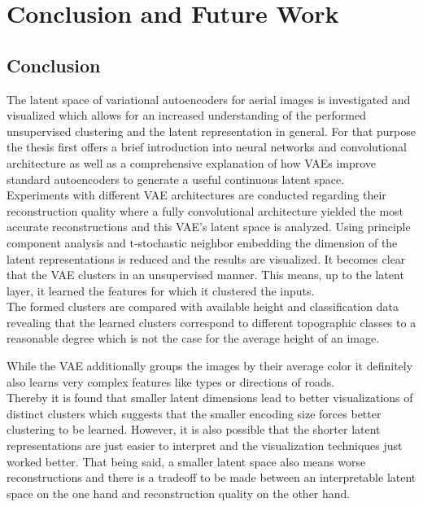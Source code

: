 \section{Conclusion and Future Work}
\subsection{Conclusion}

The latent space of variational autoencoders for aerial images is investigated and visualized 
which allows for an increased understanding of the performed unsupervised clustering and the 
latent representation in general. For that purpose the thesis first offers a brief introduction
into neural networks and convolutional architecture as well as a comprehensive explanation 
of how VAEs improve standard autoencoders to generate a useful continuous latent space.\\ 

Experiments with different VAE architectures are conducted regarding their reconstruction quality where a fully
convolutional architecture yielded the most accurate reconstructions and this VAE's latent space is analyzed.
Using principle component analysis and t-stochastic neighbor embedding the dimension of the latent representations
is reduced and the results are visualized. It becomes clear that the VAE clusters in an unsupervised manner.
This means, up to the latent layer, it learned the features for which it clustered the inputs.\\

The formed clusters are compared with available height and classification data revealing that the learned clusters
correspond to different topographic classes to a reasonable degree which is not the case for the average height of
an image. 

While the VAE additionally groups the images by their average color it definitely also learns very complex features 
like types or directions of roads.\\

Thereby it is found that smaller latent dimensions lead to better visualizations of distinct clusters which suggests
that the smaller encoding size forces better clustering to be learned. However, it is also possible that the 
shorter latent representations are just easier to interpret and the visualization techniques just worked better.
That being said, a smaller latent space also means worse reconstructions and there is a tradeoff to be made between
an interpretable latent space on the one hand and reconstruction quality on the other hand.


